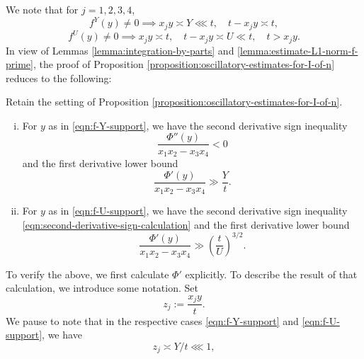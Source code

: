 \documentclass[reqno]{amsart} 
\begin{document}
We note that for $j = 1,2,3,4$,
\begin{equation}\label{eqn:f-Y-support}
  f^Y(y) \neq 0 \implies x_j y \asymp Y \lll t, \quad t- x_j y \asymp t,
\end{equation}
\begin{equation}\label{eqn:f-U-support}
  f^U(y) \neq 0 \implies x_j y \asymp t, \quad t - x_j y \asymp U \ll t, \quad t > x_j y.
\end{equation}
In view of Lemmas \ref{lemma:integration-by-parts} and \ref{lemma:estimate-L1-norm-f-prime}, the proof of Proposition \ref{proposition:oscillatory-estimates-for-I-of-n} reduces to the following:
\begin{proposition}\label{proposition:cqx50a22sj}
  Retain the setting of  Proposition \ref{proposition:oscillatory-estimates-for-I-of-n}.
  \begin{enumerate}[(i)]
  \item For $y$ as in \eqref{eqn:f-Y-support}, we have the second derivative sign inequality
    \begin{equation}\label{eqn:second-derivative-sign-calculation}
      \frac{\Phi ''(y)}{x_1 x_2 - x_3 x_4} < 0
    \end{equation}
    and the first derivative lower bound
    \begin{equation}\label{eqn:Phi-prime-lower-bound-Y}
      \frac{\Phi '(y)}{x_1 x_2 - x_3 x_4} \gg \frac{Y}{t}.
    \end{equation}
  \item For $y$ as in \eqref{eqn:f-U-support}, we have the second derivative sign inequality \eqref{eqn:second-derivative-sign-calculation} and the first derivative lower bound
    \begin{equation}\label{eqn:Phi-prime-lower-bound-U}
      \frac{\Phi '(y)}{ x_1 x_2 - x_3 x_4} \gg \left( \frac{t}{U} \right) ^{3/2}.
    \end{equation}  
  \end{enumerate}
\end{proposition}
To verify the above, we first calculate $\Phi '$ explicitly.  To describe the result of that calculation, we introduce some notation.  Set
\begin{equation*}
  z_j := \frac{x _j y }{t }.
\end{equation*}
We pause to note that in the respective cases \eqref{eqn:f-Y-support} and \eqref{eqn:f-U-support}, we have
\begin{equation*}
  z_j \asymp Y/t \lll 1,
\end{equation*}
\end{document}
